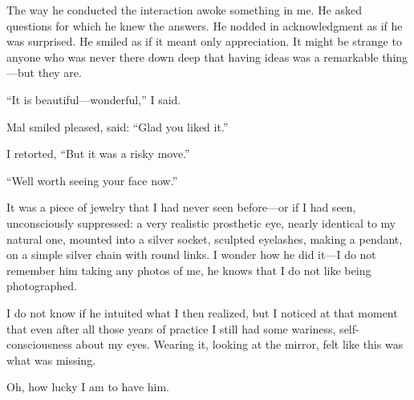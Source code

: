 The way he conducted the interaction awoke something in me. He asked questions for which he knew the answers. He nodded in acknowledgment as if he was surprised. He smiled as if it meant only appreciation. It might be strange to anyone who was never there down deep that having ideas was a remarkable thing---but they are.

%
%
%

%
%


\enquote{It is beautiful---wonderful,} I said.

Mal smiled pleased, said: \enquote{Glad you liked it.}

I retorted, \enquote{But it was a risky move.}

\enquote{Well worth seeing your face now.}

It was a piece of jewelry that I had never seen before---or if I had seen, unconsciously suppressed: a very realistic prosthetic eye, nearly identical to my natural one, mounted into a silver socket, sculpted eyelashes, making a pendant, on a simple silver chain with round links. I wonder how he did it---I do not remember him taking any photos of me, he knows that I do not like being photographed.

I do not know if he intuited what I then realized, but I noticed at that moment that even after all those years of practice I still had some wariness, self-consciousness about my eyes. Wearing it, looking at the mirror, felt like this was what was missing.

Oh, how lucky I am to have him.
